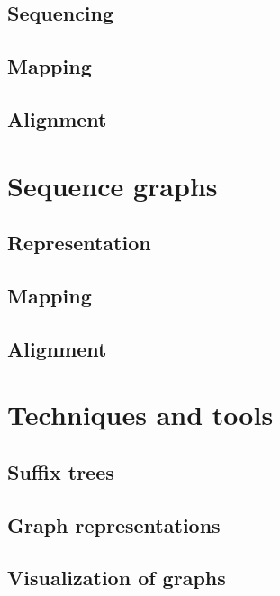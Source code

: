 \documentclass[thesis.tex]{subfiles}
\begin{document}
\subsection{Sequencing}
\subsection{Mapping}
\subsection{Alignment}
\section{Sequence graphs}
\subsection{Representation}
\subsection{Mapping}
\subsection{Alignment}
\section{Techniques and tools}
\subsection{Suffix trees}
\subsection{Graph representations}
\subsection{Visualization of graphs}
\end{document}
